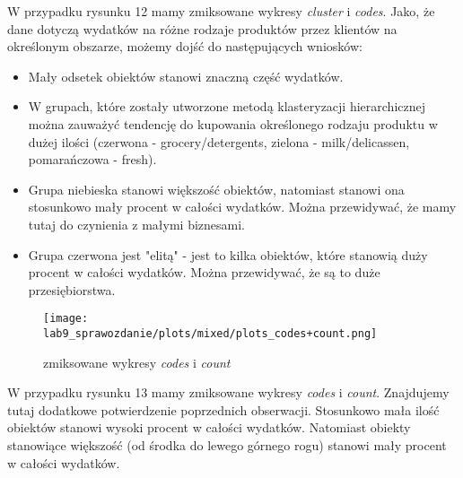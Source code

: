 \documentclass[a4paper,12pt]{article}
\theoremstyle{mytheor}
\begin{document}
W przypadku rysunku 12 mamy zmiksowane wykresy \emph{cluster} i \emph{codes}. Jako, że dane dotyczą wydatków na różne rodzaje produktów przez klientów na określonym obszarze, możemy dojść do następujących wniosków:
\begin{itemize}
 \item Mały odsetek obiektów stanowi znaczną część wydatków.
 \item W grupach, które zostały utworzone metodą klasteryzacji hierarchicznej można zauważyć tendencję do kupowania określonego rodzaju produktu w dużej ilości (czerwona - grocery/detergents, zielona - milk/delicassen, pomarańczowa - fresh).
 \item Grupa niebieska stanowi większość obiektów, natomiast stanowi ona stosunkowo mały procent w całości wydatków. Można przewidywać, że mamy tutaj do czynienia z małymi biznesami.
 \item Grupa czerwona jest "elitą" - jest to kilka obiektów, które stanowią duży procent w całości wydatków. Można przewidywać, że są to duże przesiębiorstwa.
\end{itemize}

\begin{figure}[H]
    \centering
    \texttt{[image: lab9\_sprawozdanie/plots/mixed/plots\_codes+count.png]}
    \caption{zmiksowane wykresy \emph{codes} i \emph{count}}
    \label{fig:plot13}
\end{figure}

W przypadku rysunku 13 mamy zmiksowane wykresy \emph{codes} i \emph{count}. Znajdujemy tutaj dodatkowe potwierdzenie poprzednich obserwacji. Stosunkowo mała ilość obiektów stanowi wysoki procent w całości wydatków. Natomiast obiekty stanowiące większość (od środka do lewego górnego rogu) stanowi mały procent w całości wydatków.
\end{document}
